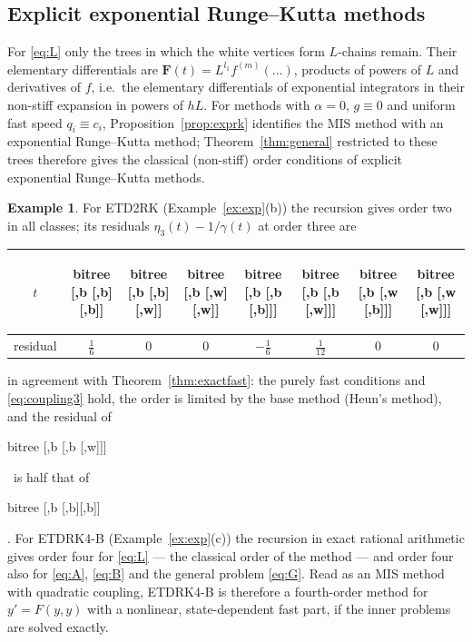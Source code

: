 \documentclass[11pt,a4paper]{article}
\theoremstyle{definition}
\newtheorem{example}[theorem]{Example}
\theoremstyle{remark}
\newcommand{\btree}[1]{\begin{forest}bitree #1\end{forest}}
\newcommand{\Tbbb}{\btree{[,b [,b][,b]]}}
\newcommand{\Tbbw}{\btree{[,b [,b][,w]]}}
\newcommand{\Tbww}{\btree{[,b [,w][,w]]}}
\newcommand{\Tbbbl}{\btree{[,b [,b [,b]]]}}
\newcommand{\Tbbwl}{\btree{[,b [,b [,w]]]}}
\newcommand{\Tbwbl}{\btree{[,b [,w [,b]]]}}
\newcommand{\Tbwwl}{\btree{[,b [,w [,w]]]}}
\begin{document}
\subsection{Explicit exponential Runge--Kutta methods}
\label{sec:exponential}

For \eqref{eq:L} only the trees in which the white vertices form $L$-chains remain. Their elementary differentials are
$\mathbf F(t)=L^{l_1}f^{(m)}(\dots)$, products of powers of $L$ and derivatives of $f$, i.e.\ the elementary
differentials of exponential integrators in their non-stiff expansion in powers of $hL$. For methods with $\alpha=0$,
$g\equiv0$ and uniform fast speed $q_i\equiv c_i$, Proposition~\ref{prop:exprk} identifies the MIS method with an
exponential Runge--Kutta method; Theorem~\ref{thm:general} restricted to these trees therefore gives the classical
(non-stiff) order conditions of explicit exponential Runge--Kutta methods.

\begin{example}
For ETD2RK (Example~\ref{ex:exp}(b)) the recursion gives order two in all classes; its residuals
$\eta_3(t)-1/\gamma(t)$ at order three are
\begin{center}
\begin{tabular}{cccccccc}
\toprule
$t$ & \Tbbb & \Tbbw & \Tbww & \Tbbbl & \Tbbwl & \Tbwbl & \Tbwwl\\\midrule
residual & $\frac16$ & $0$ & $0$ & $-\frac16$ & $\frac1{12}$ & $0$ & $0$\\
\bottomrule
\end{tabular}
\end{center}
in agreement with Theorem~\ref{thm:exactfast}: the purely fast conditions and \eqref{eq:coupling3} hold, the order is
limited by the base method (Heun's method), and the residual of \Tbbwl\ is half that of \Tbbb. For ETDRK4-B
(Example~\ref{ex:exp}(c)) the recursion in exact rational arithmetic gives order four for \eqref{eq:L} --- the classical
order of the method --- and order four also for \eqref{eq:A}, \eqref{eq:B} and the general problem \eqref{eq:G}. Read
as an MIS method with quadratic coupling, ETDRK4-B is therefore a fourth-order method for $y'=F(y,y)$ with a nonlinear,
state-dependent fast part, if the inner problems are solved exactly.
\end{example}
\end{document}
